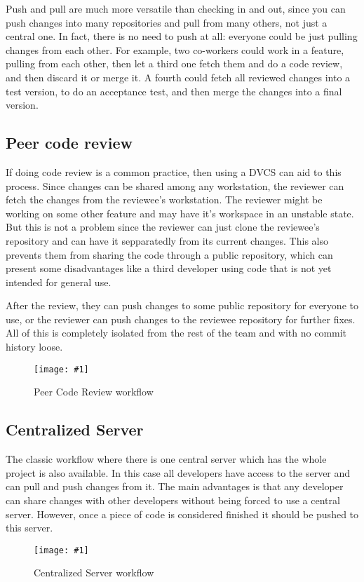 \documentclass[a4paper,10pt]{article}
\newcommand{\diagrama}[2]{
    \begin{figure}[h]
        \begin{center}
            \texttt{[image: \#1]} 
        \end{center}
        \caption{#2}
    \end{figure}
}
\begin{document}
Push and pull are much more versatile than checking in and out, since you can push 
changes into many repositories and pull from many others, not just a central one.
In fact, there is no need to push at all:
everyone could be just pulling changes from each other. For example, two co-workers could work 
in a feature, pulling from each other, then let a third one fetch them and do a code review, and then 
discard it or merge it. A fourth could fetch all reviewed changes into a test version, to do an 
acceptance test, and then merge the changes into a final version.

\subsection{Peer code review}
If doing code review is a common practice, then using a DVCS can aid to this process. Since changes can be shared
among any workstation, the reviewer can fetch the changes from the reviewee's workstation. The reviewer might be
working on some other feature and may have it's workspace in an unstable state. But this is not a problem since the
reviewer can just clone the reviewee's repository and can have it sepparatedly from its current changes.
This also prevents them from sharing the code through a public repository, which can present some disadvantages like
a third developer using code that is not yet intended for general use.

After the review, they can push changes to some public repository for everyone to use, or the reviewer can push changes to the reviewee repository for further fixes. All of this is completely isolated from the rest of the team and with no commit history loose.

\diagrama{PeerCodeReview.jpg}{Peer Code Review workflow}

\subsection{Centralized Server}
The classic workflow where there is one central server which has the whole project is also available. In this case all developers have access to the server and can pull and push changes from it. The main advantages is that any developer can share changes with other developers without being forced to use a central server. However, once a piece of code is considered finished it should be pushed to this server.

\diagrama{RepoCentral.jpg}{Centralized Server workflow}
\end{document}
